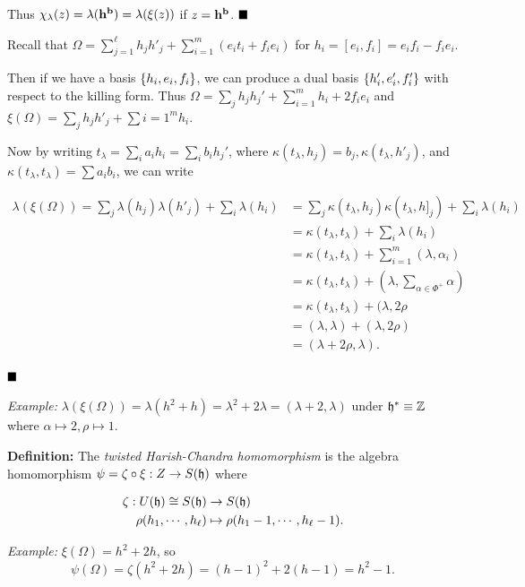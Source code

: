 Thus
\(\chi_\lambda(z) = \lambda(\mathbf{h}^{\mathbf{b}}) = \lambda(\xi(z))\)
if \(z = \mathbf{h}^{\mathbf{b}}\). \(\qed\)

Recall that
\(\Omega = \sum_{j=1}^\ell h_j h'_j + \sum_{i=1}^m (e_i t_i + f_i e_i)\)
for \(h_i = [e_i, f_i] = e_if_i - f_i e_i\).

Then if we have a basis \(\left\{{h_i, e_i, f_i}\right\}\), we can produce a
dual basis \(\left\{{h'_i, e'_i, f'_i}\right\}\) with respect to the killing
form. Thus \(\Omega = \sum_j h_j h_j' + \sum_{i=1}^m h_i + 2f_i e_i\)
and \(\xi(\Omega) = \sum_j h_j h'_j + \sum{i=1}^m h_i\).

Now by writing \(t_\lambda = \sum_i a_i h_i = \sum_i b_i h_j'\), where
\(\kappa(t_\lambda, h_j) = b_j, \kappa(t_\lambda, h'_j)\), and
\(\kappa(t_\lambda, t_\lambda) = \sum a_i b_i\), we can write

\begin{align*}
\lambda(\xi(\Omega)) = \sum_j \lambda(h_j) \lambda(h'_j) + \sum_i \lambda(h_i) 
&= \sum_j \kappa(t_\lambda, h_j)\kappa(t_\lambda, h]_j) + \sum_i \lambda(h_i) \\
&= \kappa(t_\lambda, t_\lambda) + \sum_i \lambda(h_i) \\
&= \kappa(t_\lambda, t_\lambda) + \sum_{i=1}^m (\lambda, \alpha_i) \\
&= \kappa(t_\lambda, t_\lambda) + (\lambda, \sum_{\alpha\in\Phi^+} \alpha) \\
&= \kappa(t_\lambda, t_\lambda) + (\lambda, 2\rho\\
&= (\lambda, \lambda) + (\lambda, 2\rho)  \\
&= (\lambda + 2\rho, \lambda)
.\end{align*}

\(\qed\)

\emph{Example:}
\(\lambda(\xi(\Omega)) = \lambda(h^2 + h) = \lambda^2 + 2\lambda = (\lambda+2, \lambda)\)
under \({\mathfrak{h}}^* \equiv {\mathbb{Z}}\) where \(\alpha \mapsto 2, \rho \mapsto 1\).

\textbf{Definition:} The \emph{twisted Harish-Chandra homomorphism} is
the algebra homomorphism \(\psi = \zeta \circ \xi: Z \to S({\mathfrak{h}})\)
where

\begin{align*}
\zeta: U({\mathfrak{h}}) \cong S({\mathfrak{h}}) &\to S({\mathfrak{h}}) \\
\rho(h_1, \cdots, h_\ell) &\mapsto \rho(h_1-1, \cdots, h_\ell - 1)
.\end{align*}

\emph{Example:} \(\xi(\Omega) = h^2 + 2h\), so \[
\psi(\Omega) = \zeta(h^2 + 2h) = (h-1)^2 + 2(h-1) = h^2 - 1
.\]

